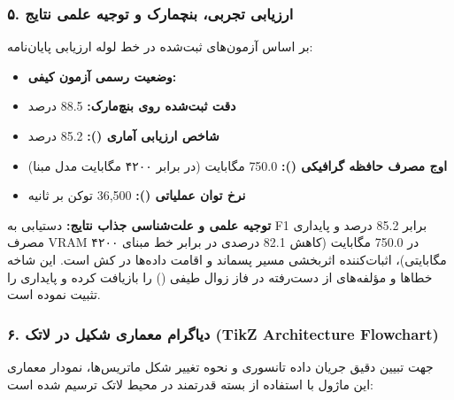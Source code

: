 \subsubsection*{۵. ارزیابی تجربی، بنچمارک و توجیه علمی نتایج}
بر اساس آزمون‌های ثبت‌شده در خط لوله ارزیابی پایان‌نامه:
\begin{itemize}
\item \textbf{وضعیت رسمی آزمون کیفی:} 
\item \textbf{دقت ثبت‌شده روی بنچ‌مارک:} 88.5 درصد
\item \textbf{شاخص ارزیابی آماری ():} 85.2 درصد
\item \textbf{اوج مصرف حافظه گرافیکی ():} 750.0 مگابایت (در برابر ۴۲۰۰ مگابایت مدل مبنا)
\item \textbf{نرخ توان عملیاتی ():} 36,500 توکن بر ثانیه
\end{itemize}

\textbf{توجیه علمی و علت‌شناسی جذاب نتایج:}
دستیابی به F1 برابر 85.2 درصد و پایداری مصرف VRAM در 750.0 مگابایت (کاهش 82.1 درصدی در برابر خط مبنای ۴۲۰۰ مگابایتی)، اثبات‌کننده اثربخشی مسیر پسماند و اقامت داده‌ها در کش  است. این شاخه خطاها و مؤلفه‌های از دست‌رفته در فاز زوال طیفی () را بازیافت کرده و پایداری را تثبیت نموده است.



\subsubsection*{۶. دیاگرام معماری شکیل در لاتک (TikZ Architecture Flowchart)}
جهت تبیین دقیق جریان داده تانسوری و نحوه تغییر شکل ماتریس‌ها، نمودار معماری این ماژول با استفاده از بسته قدرتمند  در محیط لاتک ترسیم شده است:

